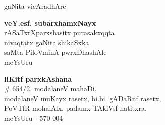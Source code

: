 \thispagestyle{empty}
\begin{center}
{\fontsize{30}{32}\selectfont gaNita vicAradhAre}
\vfill


{\LARGE\bfseries veY.esf. subarxhamxNayx}\\[4pt]
   {\large rASaTxrXparxshasitx purasakxqqta\\[4pt]
   nivaqtatx gaNita shikaSxka\\[4pt]
   saMta PiloVminA pwrxDhashAle\\[4pt]
   meYsUru}

\vfill


{{\Large\bfseries liKitf parxkAshana}\\[5pt]
{\rm \# 654/2}, modalaneV mahaDi,\\
modalaneV muKayx rasetx, bi.bi. gADaRnf rasetx, \\
PoVTfR mohalAlx, padamx TAkiVsf hatitxra,\\
meYsUru - 570 004}


\end{center}
